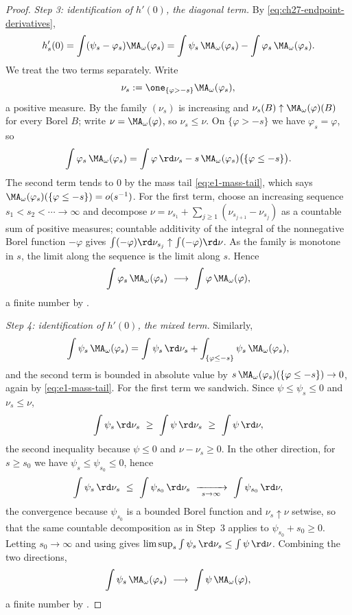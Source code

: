 \begin{proof}
\emph{Step 3: identification of $h'(0)$, the diagonal term.}
By \eqref{eq:ch27-endpoint-derivatives},
\[
 h_s'(0)=\int(\psi_s-\varphi_s)\MA_\omega(\varphi_s)
 =\int\psi_s\,\MA_\omega(\varphi_s)-\int\varphi_s\,\MA_\omega(\varphi_s).
\]
We treat the two terms separately.  Write
\[
 \nu_s:=\one_{\{\varphi>-s\}}\MA_\omega(\varphi_s),
\]
a positive measure.  By  the family
$(\nu_s)$ is increasing and $\nu_s(B)\uparrow\MA_\omega(\varphi)(B)$ for
every Borel $B$; write $\nu=\MA_\omega(\varphi)$, so $\nu_s\leq\nu$.
On $\{\varphi>-s\}$ we have $\varphi_s=\varphi$, so
\[
 \int\varphi_s\,\MA_\omega(\varphi_s)
 =\int\varphi\,\rd\nu_s
   -s\,\MA_\omega(\varphi_s)\bigl(\{\varphi\leq-s\}\bigr).
\]
The second term tends to $0$ by the mass tail \eqref{eq:e1-mass-tail},
which says $\MA_\omega(\varphi_s)(\{\varphi\leq-s\})=o(s^{-1})$.  For the
first term, choose an increasing sequence $s_1<s_2<\cdots\to\infty$ and
decompose
$\nu=\nu_{s_1}+\sum_{j\geq1}(\nu_{s_{j+1}}-\nu_{s_j})$ as a countable sum
of positive measures; countable additivity of the integral of the
nonnegative Borel function $-\varphi$ gives
$\int(-\varphi)\rd\nu_{s_j}\uparrow\int(-\varphi)\rd\nu$.  As the family
is monotone in $s$, the limit along the sequence is the limit along $s$.
Hence
\begin{equation}\label{eq:ch27-diagonal-limit}
 \int\varphi_s\,\MA_\omega(\varphi_s)
 \ \longrightarrow\ \int\varphi\,\MA_\omega(\varphi),
\end{equation}
a finite number by .

\emph{Step 4: identification of $h'(0)$, the mixed term.}
Similarly,
\[
 \int\psi_s\,\MA_\omega(\varphi_s)
 =\int\psi_s\,\rd\nu_s
  +\int_{\{\varphi\leq-s\}}\psi_s\,\MA_\omega(\varphi_s),
\]
and the second term is bounded in absolute value by
$s\,\MA_\omega(\varphi_s)(\{\varphi\leq-s\})\to0$, again by
\eqref{eq:e1-mass-tail}.  For the first term we sandwich.  Since
$\psi\leq\psi_s\leq0$ and $\nu_s\leq\nu$,
\[
 \int\psi_s\,\rd\nu_s\ \geq\ \int\psi\,\rd\nu_s\ \geq\ \int\psi\,\rd\nu ,
\]
the second inequality because $\psi\leq0$ and $\nu-\nu_s\geq0$.  In the
other direction, for $s\geq s_0$ we have $\psi_s\leq\psi_{s_0}\leq0$,
hence
\[
 \int\psi_s\,\rd\nu_s\ \leq\ \int\psi_{s_0}\,\rd\nu_s
 \ \xrightarrow[\ s\to\infty\ ]{}\ \int\psi_{s_0}\,\rd\nu ,
\]
the convergence because $\psi_{s_0}$ is a bounded Borel function and
$\nu_s\uparrow\nu$ setwise, so that the same countable decomposition as in
Step~3 applies to $\psi_{s_0}+s_0\geq0$.  Letting $s_0\to\infty$ and
using  gives
$\limsup_s\int\psi_s\,\rd\nu_s\leq\int\psi\,\rd\nu$.  Combining the two
directions,
\begin{equation}\label{eq:ch27-mixed-limit}
 \int\psi_s\,\MA_\omega(\varphi_s)
 \ \longrightarrow\ \int\psi\,\MA_\omega(\varphi),
\end{equation}
a finite number by .


\end{proof}
